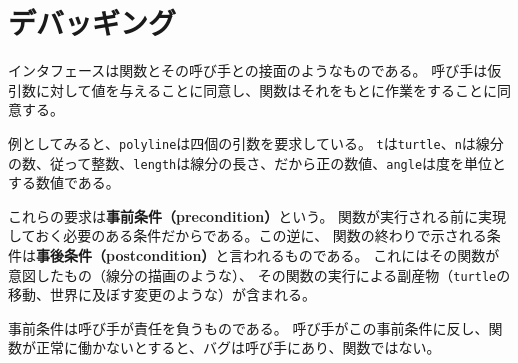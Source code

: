 \documentclass[a4j,12pt,makeidx]{jbook}
\begin{document}
\section{デバッギング}
インタフェースは関数とその呼び手との接面のようなものである。
呼び手は仮引数に対して値を与えることに同意し、関数はそれをもとに作業をすることに同意する。\par
例としてみると、{\tt polyline}は四個の引数を要求している。
{\tt t}は{\tt turtle}、{\tt n}は線分の数、従って整数、{\tt length}は線分の長さ、だから正の数値、{\tt angle}は度を単位とする数値である。\par
これらの要求は{\bf 事前条件（precondition）}という。
関数が実行される前に実現しておく必要のある条件だからである。この逆に、
関数の終わりで示される条件は{\bf 事後条件（postcondition）}と言われるものである。
これにはその関数が意図したもの（線分の描画のような）、
その関数の実行による副産物（{\tt turtle}の移動、世界に及ぼす変更のような）が含まれる。\par
事前条件は呼び手が責任を負うものである。
呼び手がこの事前条件に反し、関数が正常に働かないとすると、バグは呼び手にあり、関数ではない。
%
\end{document}
